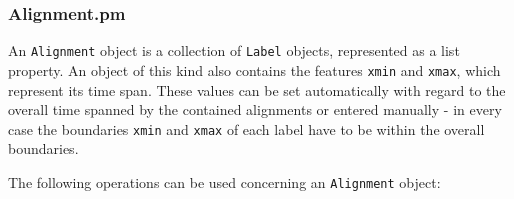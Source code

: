 \documentclass[a4,twoside=off,draft=true]{scrartcl}
\begin{document}
\subsubsection{Alignment.pm}
An {\tt Alignment} object is a collection of {\tt Label} objects, represented as a list property.
An object of this kind also contains the features {\tt xmin} and {\tt xmax}, which represent its time span. 
These values can be set automatically with regard to the overall time spanned by the contained alignments or entered manually - in every case the boundaries {\tt xmin} and {\tt xmax} of each label have to be within the overall boundaries. 

The following operations can be used concerning an {\tt Alignment} object:

\begin{itemize}


\end{itemize}
\end{document}
